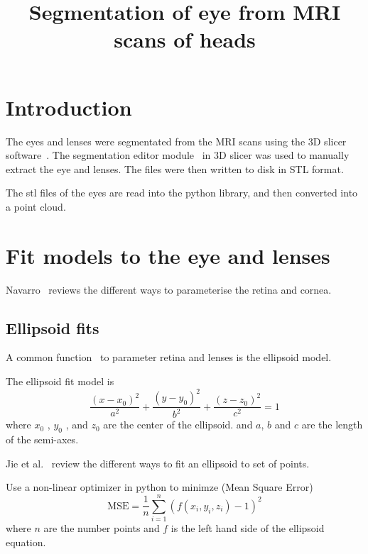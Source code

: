 \documentclass[12pt]{article}
\begin{document}
\title{Segmentation of eye from MRI scans of heads}
\date{}

\maketitle


\section{Introduction}

The eyes and lenses were segmentated from the MRI scans
using the 3D slicer software~\cite{kikinis20133d}.
The segmentation editor module~\cite{pinter2019polymorph}
in 3D slicer was used to manually
extract the eye and lenses.
The
files were then written to disk in STL format.

The stl files of the eyes are read into the python library,
and then converted into a point cloud.



\section{Fit models to the eye and lenses}

Navarro~\cite{navarro2009optical} reviews the different ways to
parameterise the retina and cornea.


\subsection{Ellipsoid fits}

A common function~\cite{van2021mri}
to parameter retina and lenses is the ellipsoid model.

The ellipsoid fit model is
\begin{equation}
\frac{(x-x_0)^2}{a^2} 
+
\frac{(y-y_0)^2}{b^2} 
+
\frac{(z-z_0)^2}{c^2}
= 1
\end{equation}
where $x_0$ , $y_0$ , and $z_0$  are the center of the ellipsoid.
and  $a$, $b$ and $c$ are the length of the semi-axes.


Jie et al.~\cite{jia2004biconic} review the different ways to fit an
ellipsoid to set of points.

Use a non-linear optimizer in python to
minimze (Mean Square Error)
\begin{equation}
\mbox{MSE} = \frac{1}{n} \sum_{i=1}^n (f(x_i,y_i,z_i) - 1)^2
\end{equation}
where $n$ are the number points and
$f$ is the left hand side of the ellipsoid equation.
\end{document}

